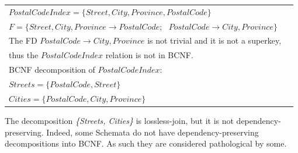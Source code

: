 \begin{center}
\begin{tabular}[h]{l l}
  $PostalCodeIndex = \{Street, City, Province, PostalCode\}$ & \\ [0.5ex]
  $F = \{Street, City, Province \rightarrow PostalCode; \mbox{ } PostalCode \rightarrow City, Province\}$ \\ [1.5ex]
  The FD $PostalCode \rightarrow City, Province$ is not trivial and it is not a superkey, \\ [0.5ex]
  thus the $PostalCodeIndex$ relation is not in BCNF. & \\ [1.5ex]
  BCNF decomposition of $PostalCodeIndex$:   &  \\ [0.5ex]
  $Streets =\{PostalCode, Street\}$ & \\ [0.5ex]
  $Cities = \{PostalCode, City, Province\}$ & \\ [0.5ex]
\end{tabular}
\end{center}

The decomposition \textit{\{Streets, Cities\}} is lossless-join, but it is not dependency-preserving. 
Indeed, some Schemata do not have dependency-preserving decompositions
into BCNF. As such they are considered pathological by some.
